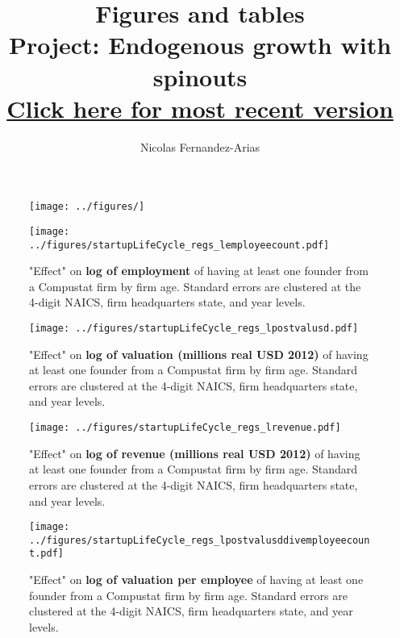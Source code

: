 \documentclass[12pt,english]{article}
\theoremstyle{remark}
\begin{document}
	
\title{Figures and tables\\ \small Project: Endogenous growth with spinouts \\ \href{https://drive.google.com/file/d/16vrZivy1MLKdUfLVawUrpLs475bzAwMg/view?usp=sharing}{Click here for most recent version}}
\author{Nicolas Fernandez-Arias}
\maketitle









\begin{figure}
	\texttt{[image: ../figures/]}
\end{figure}

\tiny


\begin{figure}
	\texttt{[image: ../figures/startupLifeCycle\_regs\_lemployeecount.pdf]}
	\caption{"Effect" on \textbf{log of employment} of having at least one founder from a Compustat firm by firm age. Standard errors are clustered at the 4-digit NAICS, firm headquarters state, and year levels.}
\end{figure}

\begin{figure}
	\texttt{[image: ../figures/startupLifeCycle\_regs\_lpostvalusd.pdf]}
	\caption{"Effect" on \textbf{log of valuation (millions real USD 2012)} of having at least one founder from a Compustat firm by firm age. Standard errors are clustered at the 4-digit NAICS, firm headquarters state, and year levels.}
\end{figure}

\begin{figure}
	\texttt{[image: ../figures/startupLifeCycle\_regs\_lrevenue.pdf]}
	\caption{"Effect" on \textbf{log of revenue (millions real USD 2012)} of having at least one founder from a Compustat firm by firm age. Standard errors are clustered at the 4-digit NAICS, firm headquarters state, and year levels.}
\end{figure}

\begin{figure}
	\texttt{[image: ../figures/startupLifeCycle\_regs\_lpostvalusddivemployeecount.pdf]}
	\caption{"Effect" on \textbf{log of valuation per employee} of having at least one founder from a Compustat firm by firm age. Standard errors are clustered at the 4-digit NAICS, firm headquarters state, and year levels.}
\end{figure}
\end{document}
